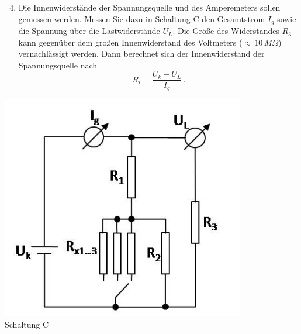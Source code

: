 \begin{minipage}[b]{0.6\textwidth}
\begin{enumerate} \setcounter{enumi}{3}
 \item Die Innenwiderstände der Spannungsquelle und des Amperemeters sollen gemessen werden. Messen Sie dazu in Schaltung C den Gesamtstrom $I_g$ sowie die Spannung über die Lastwiderstände $U_L$. Die Größe des Widerstandes $R_3$ kann gegenüber dem großen Innenwiderstand des Voltmeters ($\approx\, 10\,M\Omega$) vernachlässigt werden. Dann berechnet sich der Innenwiderstand der Spannungsquelle nach
 \begin{equation}
  R_i = \frac{U_k - U_L}{I_g}\, .
 \end{equation}
\end{enumerate}
\end{minipage}
%
\begin{minipage}[b]{0.35\textwidth}
 \centering
 \includegraphics[width=0.8\textwidth]{Abbildungen/SchaltungC.jpg}\\
 Schaltung C
\end{minipage}

